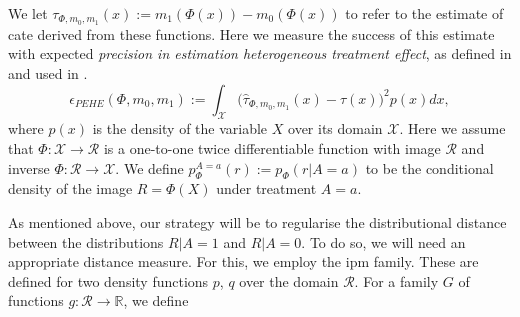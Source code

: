 \documentclass[../thesis.tex]{subfiles}
\begin{document}
We let $\tau_{\Phi, m_0, m_1}(x) := m_1(\Phi(x)) - m_0(\Phi(x))$ to refer to the estimate of \gls{cate} derived from these functions. Here we measure the success of this estimate with expected \emph{precision in estimation heterogeneous treatment effect}, as defined in \citet{hill_bayesian_2011} and used in \citet{shalit_estimating_2017}.
\[
\epsilon_{PEHE}(\Phi, m_0, m_1) :=  \int_{\mathcal{X}} \big(\hat{\tau}_{\Phi, m_0, m_1}(x) - \tau(x) \big)^2p(x) dx, 
\]
where $p(x)$ is the density of the variable $X$ over its domain $\mathcal{X}$. Here we assume that $\Phi \colon \mathcal{X} \rightarrow \mathcal{R}$ is a one-to-one twice differentiable function with image $\mathcal{R}$ and inverse $\Phi \colon \mathcal{R} \rightarrow \mathcal{X}$. We define $p_{\Phi}^{A=a}(r) := p_{\Phi}(r|A=a)$ to be the conditional density of the image $R = \Phi(X)$ under treatment $A=a$. 

As mentioned above, our strategy will be to regularise the distributional distance between the distributions $R | A = 1$ and $R | A =0$. To do so, we will need an appropriate distance measure. For this, we employ the \gls{ipm} family. These are defined for two density functions $p$, $q$ over the domain $\mathcal{R}$. For a family $G$ of functions $g \colon \mathcal{R} \rightarrow \mathbb{R}$, we define 
\end{document}
